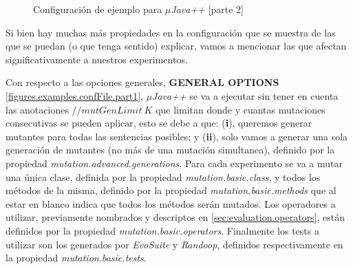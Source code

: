 \begin{figure}
	
	\caption{Configuraci\'on de ejemplo para \emph{$\mu$Java++} [parte 2]}
	\label{figures.examples.confFile.part2}
\end{figure}

Si bien hay muchas m\'as propiedades en la configuraci\'on que se muestra de las que se puedan (o que tenga sentido) explicar, vamos a mencionar las que afectan significativamente a nuestros experimentos.

Con respecto a las opciones generales, \textbf{GENERAL OPTIONS} \ref{figures.examples.confFile.part1}, \emph{$\mu$Java++} se va a ejecutar sin tener en cuenta las anotaciones $//mutGenLimit\:K$ que limitan donde y cuantas mutaciones consecutivas se pueden aplicar, esto se debe a que: (\textbf{i}), queremos generar mutantes para todas las sentencias posibles; y (\textbf{ii}), solo vamos a generar una sola generaci\'on de mutantes (no m\'as de una mutaci\'on simultanea), definido por la propiedad \emph{mutation.advanced.generations}. Para cada experimento se va a mutar una \'unica clase, definida por la propiedad \emph{mutation.basic.class}, y todos los m\'etodos de la misma, definido por la propiedad \emph{mutation.basic.methods} que al estar en blanco indica que todos los m\'etodos ser\'an mutados. Los operadores a utilizar, previamente nombrados y descriptos en \ref{sec:evaluation.operators}, est\'an definidos por la propiedad \emph{mutation.basic.operators}. Finalmente los tests a utilizar son los generados por \emph{EvoSuite} y \emph{Randoop}, definidos respectivamente en la propiedad \emph{mutation.basic.tests}.

